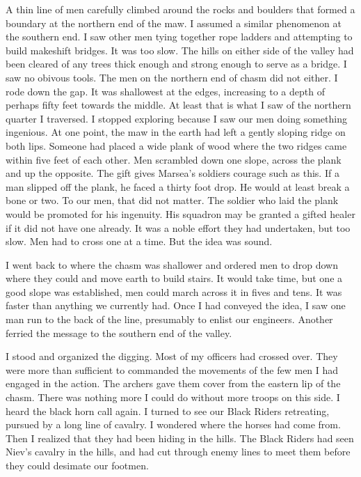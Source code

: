 \documentclass{article}
\begin{document}
A thin line of men carefully climbed around the rocks and boulders that formed a boundary at the northern end of the maw. I assumed a similar phenomenon at the southern end. I saw other men tying together rope ladders and attempting to build makeshift bridges. It was too slow. The hills on either side of the valley had been cleared of any trees thick enough and strong enough to serve as a bridge. I saw no obivous tools. The men on the northern end of chasm did not either. I rode down the gap. It was shallowest at the edges, increasing to a depth of perhaps fifty feet towards the middle. At least that is what I saw of the northern quarter I traversed. I stopped exploring because I saw our men doing something ingenious. At one point, the maw in the earth had left a gently sloping ridge on both lips. Someone had placed a wide plank of wood where the two ridges came within five feet of each other. Men scrambled down one slope, across the plank and up the opposite. The gift gives Marsea's soldiers courage such as this. If a man slipped off the plank, he faced a thirty foot drop. He would at least break a bone or two. To our men, that did not matter. The soldier who laid the plank would be promoted for his ingenuity. His squadron may be granted a gifted healer if it did not have one already. It was a noble effort they had undertaken, but too slow. Men had to cross one at a time. But the idea was sound.

I went back to where the chasm was shallower and ordered men to drop down where they could and move earth to build stairs. It would take time, but one a good slope was established, men could march across it in fives and tens. It was faster than anything we currently had. Once I had conveyed the idea, I saw one man run to the back of the line, presumably to enlist our engineers. Another ferried the message to the southern end of the valley.

I stood and organized the digging. Most of my officers had crossed over. They were more than sufficient to commanded the movements of the few men I had engaged in the action. The archers gave them cover from the eastern lip of the chasm. There was nothing more I could do without more troops on this side. I heard the black horn call again. I turned to see our Black Riders retreating, pursued by a long line of cavalry. I wondered where the horses had come from. Then I realized that they had been hiding in the hills. The Black Riders had seen Niev's cavalry in the hills, and had cut through enemy lines to meet them before they could desimate our footmen.
\end{document}
